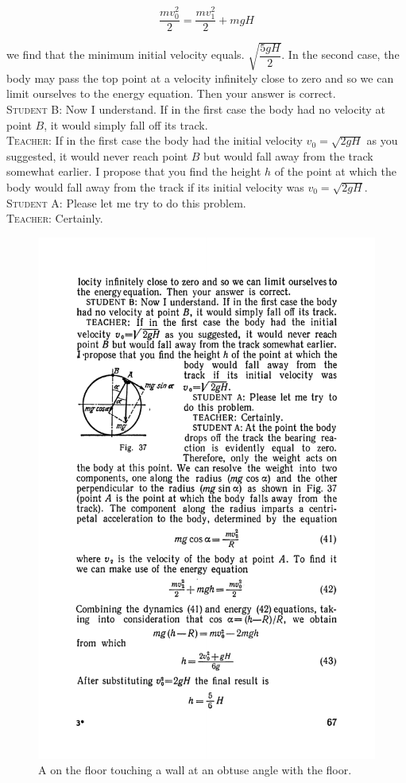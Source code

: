 \documentclass[a4paper,sfsidenotes]{tufte-book}
\begin{document}
\begin{equation}
\frac{mv_{0}^{2}}{2} = \frac{mv_{1}^{2}}{2} + mgH
\label{eq-40}
\end{equation}

we find that the minimum initial velocity equals. $\sqrt{\dfrac{5gH}{2}}$. In the second case, the body may pass the top point at a velocity infinitely close to zero and so we can limit ourselves to the energy equation. Then your answer is correct.
\\
\textsc{Student B:} Now I understand. If in the first case the body had no velocity at point $B$, it would simply fall off its track.
\\
\textsc{Teacher:} If in the first case the body had the initial velocity $v_{0}=\sqrt{2gH}$ as you suggested, it would never reach point $B$ but would fall away from the track somewhat earlier. I propose that you find the height $h$ of the point at which the body would fall away from the track if its initial velocity was $v_{0}=\sqrt{2gH}$.
\\
\textsc{Student A:} Please let me try to do this problem.
\\
\textsc{Teacher:} Certainly.
\\
\begin{figure}
\centering
\includegraphics[width=0.6\linewidth]{fig-037a.pdf}
\caption{A on the floor touching a wall at an obtuse angle with the floor.}
\label{fig-37}
\end{figure}
\end{document}
